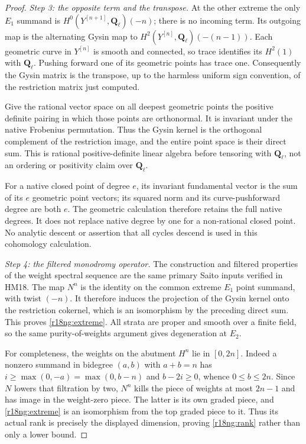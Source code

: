 \begin{proof}
\emph{Step 3: the opposite term and the transpose.}
At the other extreme the only $E_1$ summand is
$H^0(Y^{[n+1]},\mathbf Q_\ell)(-n)$; there is no incoming
term.  Its outgoing map is the alternating Gysin map to
$H^2(Y^{[n]},\mathbf Q_\ell)(-(n-1))$.
Each geometric curve in $Y^{[n]}$ is smooth and connected,
so trace identifies its $H^2(1)$ with $\mathbf Q_\ell$.
Pushing forward one of its geometric points has trace
one.  Consequently the Gysin matrix is the transpose,
up to the harmless uniform sign convention, of the
restriction matrix just computed.

Give the rational vector space on all deepest geometric
points the positive definite pairing in which those
points are orthonormal.  It is invariant under the native
Frobenius permutation.  Thus the Gysin kernel is the
orthogonal complement of the restriction image, and
the entire point space is their direct sum.  This is
rational positive-definite linear algebra before tensoring
with $\mathbf Q_\ell$, not an ordering or positivity
claim over $\mathbf Q_\ell$.

For a native closed point of degree $e$, its invariant
fundamental vector is the sum of its $e$ geometric
point vectors; its squared norm and its curve-pushforward
degree are both $e$.  The geometric calculation therefore
retains the full native degrees.  It does not replace
native degree by one for a non-rational closed point.
No analytic descent or assertion that all cycles descend
is used in this cohomology calculation.

\emph{Step 4: the filtered monodromy operator.}
The construction and filtered properties of the weight
spectral sequence are the same primary Saito inputs
verified in HM18.  The map $N^n$ is the identity on the
common extreme $E_1$ point summand, with twist $(-n)$.
It therefore induces the projection of the Gysin kernel
onto the restriction cokernel, which is an isomorphism
by the preceding direct sum.  This proves
\eqref{r18ng:extreme}.  All strata are proper and smooth
over a finite field, so the same purity-of-weights
argument gives degeneration at $E_2$.

For completeness, the weights on the abutment $H^n$
lie in $[0,2n]$.  Indeed a nonzero summand in bidegree
$(a,b)$ with $a+b=n$ has $i\ge\max(0,-a)=\max(0,b-n)$
and $b-2i\ge0$, whence $0\le b\le2n$.
Since $N$ lowers that filtration by two, $N^n$ kills
the piece of weights at most $2n-1$ and has image in
the weight-zero piece.  The latter is its own graded
piece, and \eqref{r18ng:extreme} is an isomorphism
from the top graded piece to it.  Thus its actual rank
is precisely the displayed dimension, proving
\eqref{r18ng:rank} rather than only a lower bound.


\end{proof}
